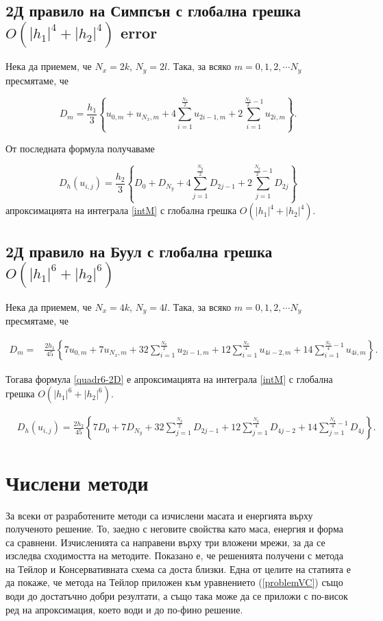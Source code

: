 \documentclass{article}
\newcommand{\rf}[1]{(\ref{#1})}
\begin{document}
\subsection{ 2Д правило на Симпсън с глобална грешка $O(|h_1|^4+|h_2|^4)$ error}

Нека да приемем, че $N_x=2k$, $N_y=2 l$. Така, за всяко $m=0,1,2,\cdots N_y$ пресмятаме, че

$$D_m= \frac{h_1 }{3} 
\left\{ u_{0,m}+u_{N_x,m}+ 4 \sum_{i=1}^{\frac{N_x}{2}}   u_{2i-1,m}
 +2 \sum_{i=1}^{\frac{N_x}{2}-1} u_{2i,m} \right\}.$$


От последната формула получаваме

\begin{equation}\label{quadr4}
D_h(u_{i,j}) =\frac{h_2 }{3} 
\left\{ D_{0}+D_{N_y}+ 4 \sum_{j=1}^{\frac{N_y}{2}}   D_{2j-1}
 +2 \sum_{j=1}^{{\frac{N_y}{2}}-1} D_{2j} \right\}
\end{equation}
апроксимацията на интеграла \eqref{intM} с глобална грешка $O(|h_1|^4+|h_2|^4)$.


\subsection{ 2Д правило на Буул с глобална грешка $O(|h_1|^6+|h_2|^6)$}

Нека да приемем, че $N_x=4k$, $N_y=4 l$. Така, за всяко $m=0,1,2,\cdots N_y$ пресмятаме, че

\begin{align*}
D_m =& \frac{2h_1}{45} 
\left\{
7u_{0,m}+7u_{N_x,m}+32 \sum_{i=1}^{\frac{N_x}{2}}u_{2i-1,m}
+12\sum_{i=1}^{\frac{N_x}{4}}u_{4i-2,m}
+14 \sum_{i=1}^{\frac{N_x}{4}-1}u_{4i,m}
\right\}.
\end{align*}

Тогава формула \eqref{quadr6-2D} е апроксимацията на интеграла \eqref{intM} с глобална грешка $O(|h_1|^6+|h_2|^6)$.

\begin{align}\label{quadr6-2D}
&D_h(u_{i,j})  =
\frac{2h_2}{45} 
\left\{
7D_{0}+7D_{N_y}+32 \sum_{j=1}^{\frac{N_y}{2}}D_{2j-1}
+12\sum_{j=1}^{\frac{N_y}{4}}D_{4j-2}
+14 \sum_{j=1}^{\frac{N_y}{4}-1}D_{4j}
\right\}.
\end{align}

\section{Числени методи}

За всеки от разработените методи са изчислени масата и енергията върху полученото решение. То, заедно с неговите свойства като маса, енергия и форма са сравнени. Изчисленията са направени върху три вложени мрежи, за да се изследва сходимостта на методите. Показано е, че решенията получени с метода на Тейлор и Консервативната схема са доста близки. Една от целите на статията е да покаже, че метода на Тейлор приложен към уравнението \rf{problemVC} също води до достатъчно добри резултати, а също така може да се приложи с по-висок ред на апроксимация, което води и до по-фино решение.
\end{document}
